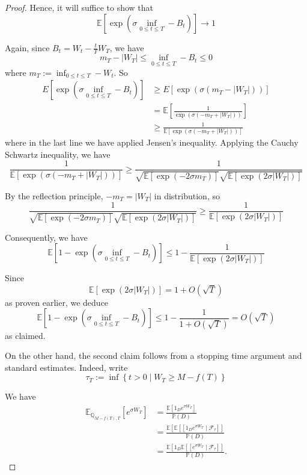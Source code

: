 \documentclass[10pt,a4paper]{amsart}
\begin{document}
\begin{proof}
Hence, it will suffice to show that
$$
\mathbb{E}\left[\exp \left(\sigma \inf _{0 \leq t \leq T}-B_{t}\right)\right] \rightarrow 1
$$

Again, since $B_{t}=W_{t}-\frac{t}{T} W_{T}$, we have
$$
m_{T}-\left|W_{T}\right| \leq \inf _{0 \leq t \leq T}-B_{t} \leq 0
$$
where $m_{T}:=\inf _{0 \leq t \leq T}-W_{t}$. So
$$
\begin{aligned}
E\left[\exp \left(\sigma \inf _{0 \leq t \leq T}-B_{t}\right)\right] & \geq E\left[\exp \left(\sigma\left(m_{T}-\left|W_{T}\right|\right)\right)\right] \\
& =\mathbb{E}\left[\frac{1}{\exp \left(\sigma\left(-m_{T}+\left|W_{T}\right|\right)\right)}\right] \\
& \geq \frac{1}{\mathbb{E}\left[\exp \left(\sigma\left(-m_{T}+\left|W_{T}\right|\right)\right)\right]}
\end{aligned}
$$
where in the last line we have applied Jensen's inequality. Applying the Cauchy Schwartz inequality, we have
$$
\frac{1}{\mathbb{E}\left[\exp \left(\sigma\left(-m_{T}+\left|W_{T}\right|\right)\right)\right]} \geq \frac{1}{\sqrt{\mathbb{E}\left[\exp \left(-2 \sigma m_{T}\right)\right]} \sqrt{\mathbb{E}\left[\exp \left(2 \sigma\left|W_{T}\right|\right)\right]}}
$$

By the reflection principle, $-m_{T}=\left|W_{T}\right|$ in distribution, so
$$
\frac{1}{\sqrt{\mathbb{E}\left[\exp \left(-2 \sigma m_{T}\right)\right]} \sqrt{\mathbb{E}\left[\exp \left(2 \sigma\left|W_{T}\right|\right)\right]}} \geq \frac{1}{\mathbb{E}\left[\exp \left(2 \sigma\left|W_{T}\right|\right)\right]}
$$

Consequently, we have
$$
\mathbb{E}\left[1-\exp \left(\sigma \inf _{0 \leq t \leq T}-B_{t}\right)\right] \leq 1-\frac{1}{\mathbb{E}\left[\exp \left(2 \sigma\left|W_{T}\right|\right)\right]}
$$

Since
$$
\mathbb{E}\left[\exp \left(2 \sigma\left|W_{T}\right|\right)\right]=1+O(\sqrt{T})
$$
as proven earlier, we deduce
$$
\mathbb{E}\left[1-\exp \left(\sigma \inf _{0 \leq t \leq T}-B_{t}\right)\right] \leq 1-\frac{1}{1+O(\sqrt{T})}=O(\sqrt{T})
$$
as claimed.

On the other hand, the second claim follows from a stopping time argument and standard estimates. Indeed, write
$$
\tau_{T}:=\inf \left\{t>0 \mid W_{T} \geq M-f(T)\right\}
$$

We have
$$
\begin{aligned}
\mathbb{E}_{\mathbb{Q}_{M-f(T), T}}\left[e^{\sigma W_{T}}\right] & =\frac{\mathbb{E}\left[1_{D} e^{\sigma W_{T}}\right]}{\mathbb{P}(D)} \\
& =\frac{\mathbb{E}\left[\mathbb{E}\left[\left[1_{D} e^{\sigma W_{T}} \mid \mathcal{F}_{\tau}\right]\right]\right.}{\mathbb{P}(D)} \\
& =\frac{\mathbb{E}\left[1_{D} \mathbb{E}\left[\left[e^{\sigma W_{T}} \mid \mathcal{F}_{\tau}\right]\right]\right.}{\mathbb{P}(D)} .
\end{aligned}
$$


\end{proof}
\end{document}
